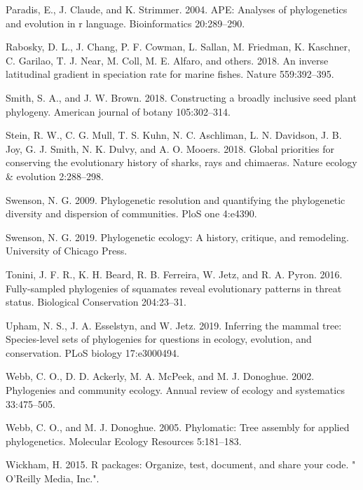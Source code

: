 \documentclass[
  12pt,
]{article}
\newlength{\cslhangindent}
\newlength{\cslentryspacingunit} %
\newenvironment{CSLReferences}[2] %
 {%
  \setlength{\parindent}{0pt}
  \ifodd #1
  \let\oldpar\par
  \def\par{\hangindent=\cslhangindent\oldpar}
  \fi
  \setlength{\parskip}{#2\cslentryspacingunit}
 }%
 {}
\begin{document}
\begin{CSLReferences}{1}{0}
\leavevmode{}%
Paradis, E., J. Claude, and K. Strimmer. 2004. APE: Analyses of phylogenetics and evolution in r language. Bioinformatics 20:289--290.

\leavevmode{}%
Rabosky, D. L., J. Chang, P. F. Cowman, L. Sallan, M. Friedman, K. Kaschner, C. Garilao, T. J. Near, M. Coll, M. E. Alfaro, and others. 2018. An inverse latitudinal gradient in speciation rate for marine fishes. Nature 559:392--395.

\leavevmode{}%
Smith, S. A., and J. W. Brown. 2018. Constructing a broadly inclusive seed plant phylogeny. American journal of botany 105:302--314.

\leavevmode{}%
Stein, R. W., C. G. Mull, T. S. Kuhn, N. C. Aschliman, L. N. Davidson, J. B. Joy, G. J. Smith, N. K. Dulvy, and A. O. Mooers. 2018. Global priorities for conserving the evolutionary history of sharks, rays and chimaeras. Nature ecology \& evolution 2:288--298.

\leavevmode{}%
Swenson, N. G. 2009. Phylogenetic resolution and quantifying the phylogenetic diversity and dispersion of communities. PloS one 4:e4390.

\leavevmode{}%
Swenson, N. G. 2019. Phylogenetic ecology: A history, critique, and remodeling. University of Chicago Press.

\leavevmode{}%
Tonini, J. F. R., K. H. Beard, R. B. Ferreira, W. Jetz, and R. A. Pyron. 2016. Fully-sampled phylogenies of squamates reveal evolutionary patterns in threat status. Biological Conservation 204:23--31.

\leavevmode{}%
Upham, N. S., J. A. Esselstyn, and W. Jetz. 2019. Inferring the mammal tree: Species-level sets of phylogenies for questions in ecology, evolution, and conservation. PLoS biology 17:e3000494.

\leavevmode{}%
Webb, C. O., D. D. Ackerly, M. A. McPeek, and M. J. Donoghue. 2002. Phylogenies and community ecology. Annual review of ecology and systematics 33:475--505.

\leavevmode{}%
Webb, C. O., and M. J. Donoghue. 2005. Phylomatic: Tree assembly for applied phylogenetics. Molecular Ecology Resources 5:181--183.

\leavevmode{}%
Wickham, H. 2015. R packages: Organize, test, document, and share your code. " O'Reilly Media, Inc.".

\end{CSLReferences}
\end{document}
